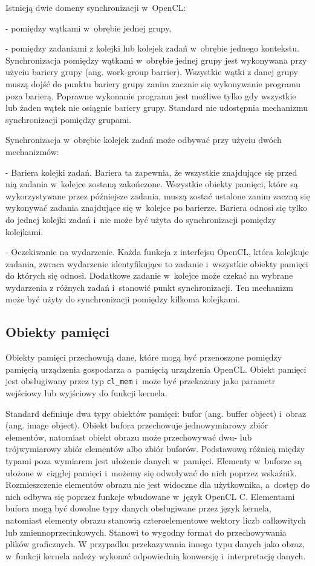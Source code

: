 Istnieją dwie domeny synchronizacji w~OpenCL:

- pomiędzy wątkami w~obrębie jednej grupy,

- pomiędzy zadaniami z kolejki lub kolejek zadań w~obrębie jednego kontekstu.\\

Synchronizacja pomiędzy wątkami w~obrębie jednej grupy jest wykonywana przy użyciu bariery grupy (ang. work-group barrier). Wszystkie wątki z danej grupy muszą dojść do punktu bariery grupy zanim zacznie się wykonywanie programu poza barierą. Poprawne wykonanie programu jest możliwe tylko gdy wszystkie lub żaden wątek nie osiągnie bariery grupy. Standard nie udostępnia mechanizmu synchronizacji pomiędzy grupami.

Synchronizacja w~obrębie kolejek zadań może odbywać przy użyciu dwóch mechanizmów:

- Bariera kolejki zadań. Bariera ta zapewnia, że wszystkie znajdujące się przed nią zadania w~kolejce zostaną zakończone. Wszystkie obiekty pamięci, które są wykorzystywane przez późniejsze zadania, muszą zostać ustalone zanim zaczną się wykonywać zadania znajdujące się w~kolejce po barierze. Bariera odnosi się tylko do jednej kolejki zadań i~nie może być użyta do synchronizacji pomiędzy kolejkami. 

- Oczekiwanie na wydarzenie. Każda funkcja z interfejsu OpenCL, która kolejkuje zadania, zwraca wydarzenie identyfikujące to zadanie i~wszystkie obiekty pamięci do których się odnosi. Dodatkowe zadanie w~kolejce może czekać na wybrane wydarzenia z różnych zadań i~stanowić punkt synchronizacji. Ten mechanizm może być użyty do synchronizacji pomiędzy kilkoma kolejkami.

\subsection{Obiekty pamięci}\label{sec:OpenC61asdL}

Obiekty pamięci przechowują dane, które mogą być przenoszone pomiędzy pamięcią urządzenia gospodarza a~pamięcią urządzenia OpenCL. Obiekt pamięci jest obsługiwany przez typ \verb|cl_mem| i~może być przekazany jako parametr wejściowy lub wyjściowy do funkcji kernela.

Standard definiuje dwa typy obiektów pamięci: bufor (ang. buffer object) i~obraz (ang. image object). Obiekt bufora przechowuje jednowymiarowy zbiór elementów, natomiast obiekt obrazu może przechowywać dwu- lub trójwymiarowy zbiór elementów albo zbiór buforów. Podstawową różnicą między typami poza wymiarem jest ułożenie danych w~pamięci. Elementy w~buforze są ułożone w~ciągłej pamięci i~możemy się odwoływać do nich poprzez wskaźnik. Rozmieszczenie elementów obrazu nie jest widoczne dla użytkownika, a~dostęp do nich odbywa się poprzez funkcje wbudowane w~język OpenCL C. Elementami bufora mogą być dowolne typy danych obsługiwane przez język kernela, natomiast elementy obrazu stanowią czteroelementowe wektory liczb całkowitych lub zmiennoprzecinkowych. Stanowi to wygodny format do przechowywania plików graficznych. W przypadku przekazywania innego typu danych jako obraz, w~funkcji kernela należy wykonać odpowiednią konwersję i~interpretację danych.

